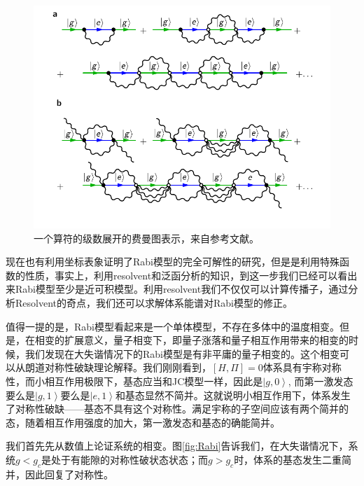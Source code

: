 \documentclass[supercite]{HustGraduPaper}
\newcommand{\ket}[1]{\left| #1 \right\rangle}
\begin{document}
\begin{figure}
	\centering
	\includegraphics[width=0.7\linewidth]{Figures/Feynman/FigFeynmanFirst3Diagrams}
	\caption{一个算符的级数展开的费曼图表示，来自参考文献\cite{di2017feynman}。}
	\label{fig:figfeynmanfirst3diagrams}
\end{figure}

现在也有利用坐标表象证明了Rabi模型的完全可解性的研究，但是是利用特殊函数的性质，事实上，利用resolvent和泛函分析的知识，到这一步我们已经可以看出来Rabi模型至少是近可积模型。利用resolvent我们不仅仅可以计算传播子，通过分析Resolvent的奇点，我们还可以求解体系能谱对Rabi模型的修正。

值得一提的是，Rabi模型看起来是一个单体模型，不存在多体中的温度相变。但是，在相变的扩展意义，量子相变下，即量子涨落和量子相互作用带来的相变的时候，我们发现在大失谐情况下的Rabi模型是有非平庸的量子相变的。这个相变可以从朗道对称性破缺理论解释。我们刚刚看到，$[H,\Pi] = 0$体系具有宇称对称性，而小相互作用极限下，基态应当和JC模型一样，因此是$\ket{g,0}$, 而第一激发态要么是$\ket{g,1}$要么是$\ket{e,1}$和基态显然不简并。这就说明小相互作用下，体系发生了对称性破缺——基态不具有这个对称性。满足宇称的子空间应该有两个简并的态，随着相互作用强度的加大，第一激发态和基态的确能简并。

我们首先先从数值上论证系统的相变。图\ref{fig:Rabi}告诉我们，在大失谐情况下，系统$g<g_c$是处于有能隙的对称性破状态状态；而$g>g_c$时，体系的基态发生二重简并，因此回复了对称性。
\end{document}
